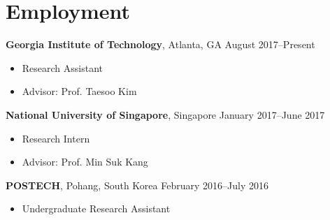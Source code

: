 \section*{Employment}

\begin{description}
\item {\bf Georgia Institute of Technology}, Atlanta, GA \dotfill August 2017--Present
  \begin{itemize}
  \item Research Assistant
  \item Advisor: Prof. Taesoo Kim
  \end{itemize}
  
\item {\bf National University of Singapore}, Singapore \dotfill January 2017--June 2017
  \begin{itemize}
  \item Research Intern
  \item Advisor: Prof. Min Suk Kang
  \end{itemize}

\item {\bf POSTECH}, Pohang, South Korea \dotfill February 2016--July 2016
  \begin{itemize}
  \item Undergraduate Research Assistant
  \end{itemize}
\end{description}
